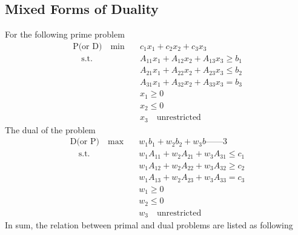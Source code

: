         \subsection{Mixed Forms of Duality}
            For the following prime problem
            \begin{align}
                \text{P(or D)} \quad \min \quad & c_1x_1 + c_2x_2 + c_3x_3 \nonumber\\
                \quad \text{s.t.} \quad & A_{11}x_1 + A_{12}x_2 + A_{13}x_3 \ge b_1 \nonumber\\
                                        & A_{21}x_1 + A_{22}x_2 + A_{23}x_3 \le b_2 \nonumber\\
                                        & A_{31}x_1 + A_{32}x_2 + A_{33}x_3 = b_3 \nonumber\\
                                        & x_1 \ge 0 \nonumber\\
                                        & x_2 \le 0 \nonumber\\
                                        & x_3 \quad \text{unrestricted} \nonumber
            \end{align}
            The dual of the problem
            \begin{align}
                \text{D(or P)} \quad \max \quad & w_1b_1 + w_2b_2 + w_3b——3 \nonumber\\
                \quad \text{s.t.} \quad & w_1A_{11} + w_2A_{21} + w_3A_{31} \le c_1 \nonumber\\
                                        & w_1A_{12} + w_2A_{22} + w_3A_{32} \ge c_2 \nonumber\\
                                        & w_1A_{13} + w_2A_{23} + w_3A_{33} = c_3 \nonumber\\
                                        & w_1 \ge 0 \nonumber\\
                                        & w_2 \le 0 \nonumber\\
                                        & w_3 \quad \text{unrestricted} \nonumber
            \end{align}
            In sum, the relation between primal and dual problems are listed as following\\
